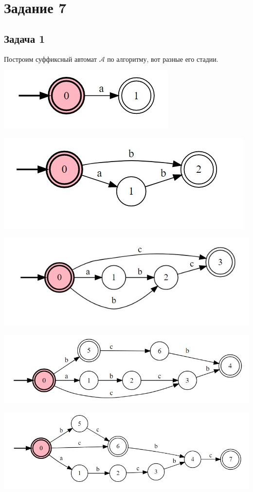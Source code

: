 \documentclass[a4paper,14pt]{article} %
\begin{document}

\section{Задание 7}
\subsection{Задача 1}
Построим суффиксный автомат $\mathcal{A}$ по алгоритму, вот разные его стадии.

\includegraphics{01.jpg}

\includegraphics{02.jpg}

\includegraphics{03.jpg}

\includegraphics{04.jpg}

\includegraphics{05.jpg}
\end{document}
